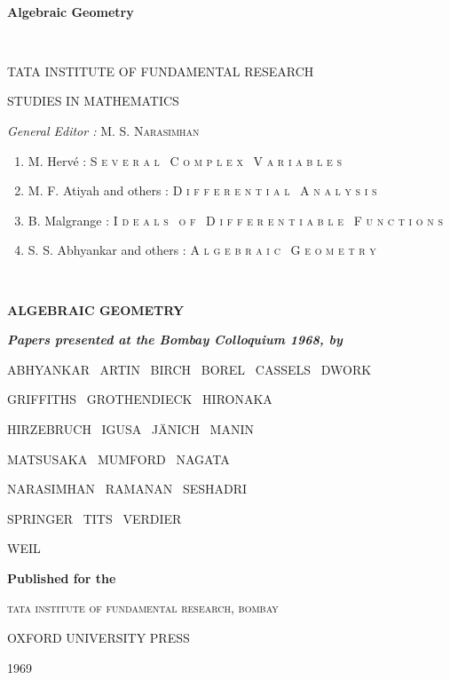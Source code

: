 ~\vfill

\begin{center}
{\Large\bf Algebraic Geometry}
\medskip

\thispagestyle{empty}
\end{center}

\vfill\eject

~\phantom{a}
\thispagestyle{empty}

\begin{center}
TATA INSTITUTE OF FUNDAMENTAL RESEARCH

STUDIES IN MATHEMATICS

\bigskip
{\em General Editor :} M. S. \textsc{Narasimhan}
\end{center}

\begin{enumerate}
\item M. Herv\'e : \textsc{\small S e v e r a l \ C o m p l e x \ V a r i a b l e s} 

\item M. F. Atiyah and others : \textsc{\small D i f f e r e n t i a l \ A n a l y s i s}

\item B. Malgrange : \textsc{\small I d e a l s \  o f \ D i f f e r e n t i a b l e \ F u n c t i o n s}

\item S. S. Abhyankar and others : \textsc{\small A l g e b r a i c \ G e o m e t r y}
\end{enumerate}

\vfill\eject


\thispagestyle{empty}

~

\begin{center}
{\Large\bf ALGEBRAIC GEOMETRY}
\medskip
\end{center}

\vskip 1cm

\begin{center}
{\textit\bfseries Papers presented at the Bombay Colloquium 1968, by}
\end{center}

\smallskip

\begin{center}
ABHYANKAR \ ARTIN \ BIRCH \ BOREL \ CASSELS \ DWORK

GRIFFITHS \ GROTHENDIECK \ HIRONAKA

HIRZEBRUCH \ IGUSA \ J\"ANICH \ MANIN

MATSUSAKA \ MUMFORD \ NAGATA

NARASIMHAN \ RAMANAN \ SESHADRI

SPRINGER \ TITS \ VERDIER

WEIL

\vfill

{\bf Published for the}
\medskip

\textsc{tata institute of fundamental research, bombay}

\medskip

{\large OXFORD UNIVERSITY PRESS}

\smallskip

{1969}
\end{center}


